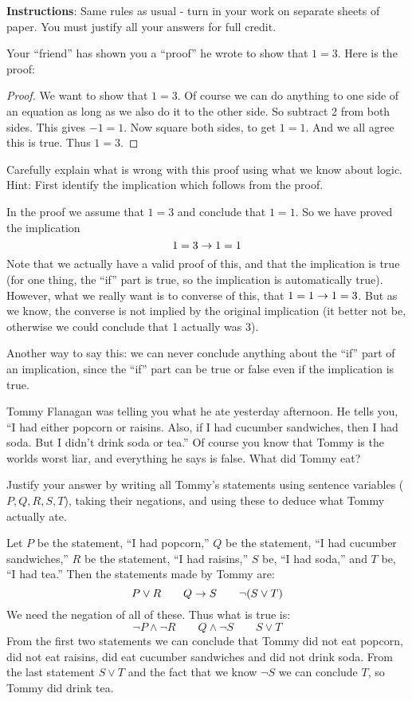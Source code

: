 \documentclass[11pt]{exam}
\begin{document}
\noindent \textbf{Instructions}: Same rules as usual - turn in your work on separate sheets of paper.  You must justify all your answers for full credit.

\begin{questions}
\question[3] Your ``friend'' has shown you a ``proof'' he wrote to show that $1 = 3$.  Here is the proof:

\begin{proof}
We want to show that $1 = 3$.  Of course we can do anything to one side of an equation as long as we also do it to the other side.  So subtract 2 from both sides.  This gives $-1 = 1$.  Now square both sides, to get $1 = 1$.  And we all agree this is true. Thus $1=3$.
\end{proof}

Carefully explain what is wrong with this proof using what we know about logic.  Hint: First identify the implication which follows from the proof.

\begin{solution}
In the proof we assume that $1=3$ and conclude that $1=1$.  So we have proved the implication
\[1=3 \rightarrow 1=1\]
Note that we actually have a valid proof of this, and that the implication is true (for one thing, the ``if'' part is true, so the implication is automatically true).  However, what we really want is to converse of this, that $1=1 \rightarrow 1=3$.  But as we know, the converse is not implied by the original implication (it better not be, otherwise we could conclude that 1 actually was 3).  

Another way to say this: we can never conclude anything about the ``if'' part of an implication, since the ``if'' part can be true or false even if the implication is true.
\end{solution}



\question[5] Tommy Flanagan was telling you what he ate yesterday afternoon.  He tells you, ``I had either popcorn or raisins.  Also, if I had cucumber sandwiches, then I had soda.  But I didn't drink soda or tea.''  Of course you know that Tommy is the worlds worst liar, and everything he says is false.  What did Tommy eat?  

Justify your answer by writing all Tommy's statements using sentence variables ($P, Q, R, S, T$), taking their negations, and using these to deduce what Tommy actually ate.

\begin{solution}
Let $P$ be the statement, ``I had popcorn,'' $Q$ be the statement, ``I had cucumber sandwiches,'' $R$ be the statement, ``I had raisins,'' $S$ be, ``I had soda,'' and $T$ be, ``I had tea.''  Then the statements made by Tommy are:
\[P \vee R \qquad Q \rightarrow S \qquad \neg(S \vee T)\]
We need the negation of all of these.  Thus what is true is:
\[\neg P \wedge \neg R \qquad Q \wedge \neg S \qquad S \vee T\]
From the first two statements we can conclude that Tommy did not eat popcorn, did not eat raisins, did eat cucumber sandwiches and did not drink soda.  From the last statement $S \vee T$ and the fact that we know $\neg S$ we can conclude $T$, so Tommy did drink tea.
\end{solution}



\end{questions}
\end{document}
